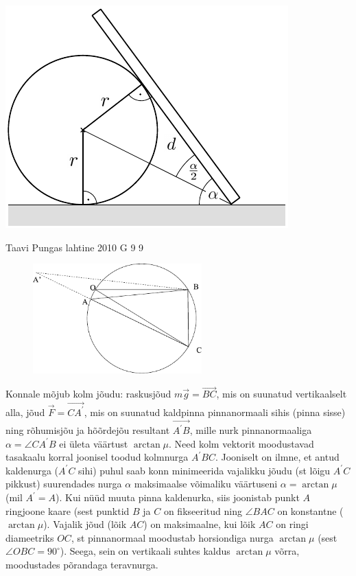 \documentclass[11pt, twoside]{article}
\begin{document}
{{\begin{center}
	\includegraphics[width=0.7\linewidth]{2008-v3g-09-lah2}
\end{center}
\fi
}

{Taavi Pungas} %
{lahtine} %
{2010} %
{G 9} %
{9} %
{

\ifSolution
\begin{figure}
	\vspace{-4ex}
	\includegraphics[width=65mm]{2010-lahg-09-lah}
	\vspace{-6ex}
\end{figure}
Konnale mõjub kolm jõudu: raskusjõud $m\vec g = \vec {BC}$, mis on suunatud vertikaalselt alla, jõud $\vec F =\vec {CA^\prime}$, 
mis on suunatud kaldpinna pinnanormaali sihis (pinna sisse)
ning rõhumisjõu ja hõõrdejõu resultant $\vec {A^\prime B}$, mille nurk pinnanormaaliga $\alpha=\angle CA^\prime B$ ei ületa väärtust 
$\arctan \mu$. Need kolm vektorit moodustavad tasakaalu korral
joonisel toodud kolmnurga $A^\prime BC$. Jooniselt on ilmne, et antud kaldenurga 
($A^\prime C$ sihi) puhul saab konn minimeerida vajalikku jõudu (st lõigu $A^\prime C$ pikkust) 
suurendades nurga $\alpha$ maksimaalse võimaliku väärtuseni $\alpha = \arctan \mu$ (mil $A^\prime = A$). Kui nüüd muuta pinna kaldenurka, 
siis joonistab punkt $A$ ringjoone kaare (sest punktid $B$ ja $C$ on fikseeritud ning $\angle BAC$ on konstantne ($\arctan \mu$). 
Vajalik jõud (lõik $AC$) on maksimaalne, kui lõik $AC$ on ringi diameetriks $OC$, st pinnanormaal moodustab horsiondiga 
nurga $\arctan\mu$ (sest $\angle OBC=90^\circ$). Seega, sein on vertikaali suhtes kaldus $\arctan \mu$ võrra, moodustades põrandaga teravnurga.

}}
\end{document}
